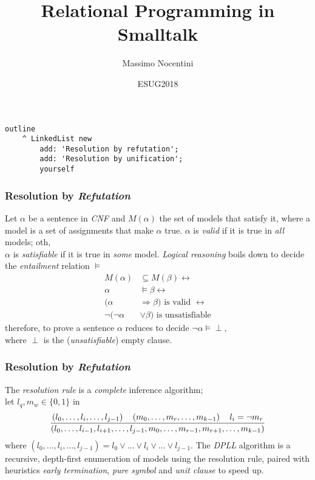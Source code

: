 \documentclass{beamer}
\title{Relational Programming in Smalltalk}
\author{Massimo Nocentini}
\institute{University of Florence, Italy}
\date{ESUG2018}
\begin{document}
\frame{\titlepage}

\begin{frame}[fragile]
\frametitle{}
\begin{verbatim}
outline
    ^ LinkedList new
        add: 'Resolution by refutation';
        add: 'Resolution by unification';
        yourself
\end{verbatim}
\end{frame}


\begin{frame}[fragile]

\frametitle{Resolution by \textit{Refutation}}

Let $\alpha$ be a sentence in \textit{CNF} and $M(\alpha)$ the set of models that
satisfy it, where a model is a set of assignments that make $\alpha$ true.
\vfill
$\alpha$ is \textit{valid} if it is true in \textit{all} models; oth,\\
$\alpha$ is \textit{satisfiable} if it is true in \textit{some} model.
\vfill
\textit{Logical reasoning} boils down to decide the \textit{entailment}
relation $\models$
\begin{displaymath}
\begin{split}
M(\alpha) &\subseteq M(\beta) \leftrightarrow \\
\alpha &\models \beta \leftrightarrow \\
(\alpha &\Rightarrow \beta) \text{ is valid } \leftrightarrow\\
\neg(\neg\alpha &\vee \beta) \text{ is unsatisfiable}
\end{split}
\end{displaymath}
therefore, to prove a sentence $\alpha$ reduces to decide
$\neg\alpha\models\perp$,\\where $\perp$ is the (\textit{unsatisfiable}) empty
clause.
\end{frame}

\begin{frame}[fragile]
\frametitle{Resolution by \textit{Refutation}}
The \textit{resolution rule} is a \textit{complete} inference algorithm; \\
let $l_{q}, m_{w} \in\lbrace 0,1\rbrace$ in
\begin{displaymath}
{\left(l_{0}, \ldots, l_{i}, \ldots, l_{j-1}\right) \quad \left(m_{0}, \ldots, m_{r},\ldots, m_{k-1}\right) \quad l_{i} = \neg m_{r}
\over
\left(l_{0},\ldots, l_{i-1},l_{i+1}, \ldots,l_{j-1}, m_{0},\ldots, m_{r-1},m_{r+1},\ldots, m_{k-1}\right)}
\end{displaymath}
where $\left(l_{0},\ldots, l_{i}, \ldots, l_{j-1}\right) = l_{0}\vee \ldots \vee l_{i} \vee \ldots \vee l_{j-1}$.
\vfill
The \textit{DPLL} algorithm is a recursive, depth-first enumeration of models
using the resolution rule, paired with heuristics \textit{early termination},
\textit{pure symbol} and \textit{unit clause} to speed up.
\end{frame}
\end{document}
